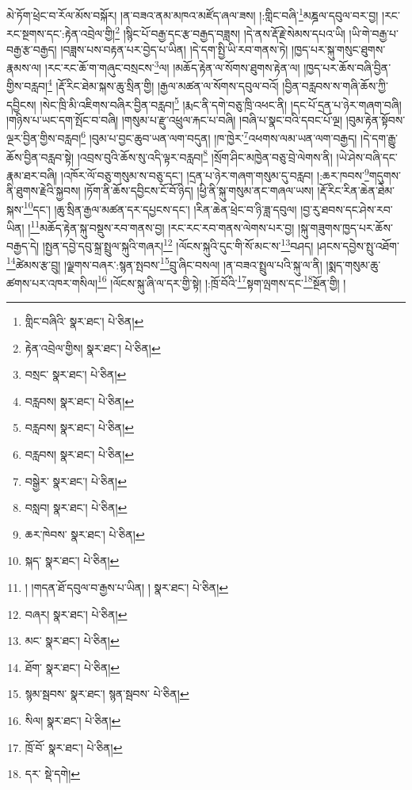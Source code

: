 མེ་ཏོག་ཕྲེང་བ་རོལ་མོས་བསྐོར། །ན་བཟའ་ནམ་མཁའ་མཛོད་ཞལ་ཟས། །:གླིང་བཞི་\footnote{གླིང་བཞིའི་  སྣར་ཐང་།  པེ་ཅིན། }མཎྜལ་དབུལ་བར་བྱ། །རང་རང་སྔགས་དང་:རྟེན་འབྲེལ་གྱི།\footnote{རྟེན་འབྲེལ་གྱིས།  སྣར་ཐང་།  པེ་ཅིན། } །སྙིང་པོ་བརྒྱ་དང་རྩ་བརྒྱད་བཟླས། །དེ་ནས་རྡོ་རྗེ་སེམས་དཔའ་ཡི། །ཡི་གེ་བརྒྱ་པ་བརྒྱ་རྩ་བརྒྱད། །བཟླས་པས་བརྟན་པར་བྱེད་པ་ཡིན། །དེ་དག་སྤྱི་ཡི་རབ་གནས་ཏེ། །ཁྱད་པར་སྐུ་གསུང་ཐུགས་རྣམས་ལ། །རང་རང་ཆོ་ག་གཞུང་བསྲངས་\footnote{བསྲང་  སྣར་ཐང་།  པེ་ཅིན། }ལ། །མཆོད་རྟེན་ལ་སོགས་ཐུགས་རྟེན་ལ། །ཁྱད་པར་ཆོས་བཞི་བྱིན་གྱིས་བརླབ།\footnote{བརླབས།  སྣར་ཐང་།  པེ་ཅིན། } །རྡོ་རིང་ཐེམ་སྐས་ཆུ་སྲིན་གྱི། །རྒྱལ་མཚན་ལ་སོགས་དབུལ་བའོ། །བྱིན་བརླབས་ས་གཞི་ཆོས་ཀྱི་དབྱིངས། །སེང་ཁྲི་མི་འཇིགས་བཞིར་བྱིན་བརླབ།\footnote{བརླབས།  སྣར་ཐང་།  པེ་ཅིན། } །རྨང་ནི་དགེ་བཅུ་ཁྲི་འཕང་ནི། །དང་པོ་དྲན་པ་ཉེར་གཞག་བཞི། །གཉིས་པ་ཡང་དག་སྤོང་བ་བཞི། །གསུམ་པ་རྫུ་འཕྲུལ་རྐང་པ་བཞི། །བཞི་པ་སྣང་བའི་དབང་པོ་ལྔ། །བུམ་རྟེན་སྟོབས་ལྔར་བྱིན་གྱིས་བརླབ།\footnote{བརླབས།  སྣར་ཐང་།  པེ་ཅིན། } །བུམ་པ་བྱང་ཆུབ་ཡན་ལག་བདུན། །ཁ་ཁྱེར་\footnote{བསྒྱེར་  སྣར་ཐང་།  པེ་ཅིན། }འཕགས་ལམ་ཡན་ལག་བརྒྱད། །དེ་དག་རྒྱུ་ཆོས་བྱིན་བརླབ་སྟེ། །འབྲས་བུའི་ཆོས་སུ་འདི་ལྟར་བརླབ།\footnote{བསླབ།  སྣར་ཐང་།  པེ་ཅིན། } །སྲོག་ཤིང་མཁྱེན་བཅུ་བྲེ་ལེགས་ནི། །ཡེ་ཤེས་བཞི་དང་རྣམ་ཐར་བཞི། །འཁོར་ལོ་བཅུ་གསུམ་ས་བཅུ་དང་། །དྲན་པ་ཉེར་གཞག་གསུམ་དུ་བརླབ། །:ཆར་ཁབས་\footnote{ཆར་ཁེབས་  སྣར་ཐང་།  པེ་ཅིན། }གདུགས་ནི་ཐུགས་རྗེའི་སྐྱབས། །ཏོག་ནི་ཆོས་དབྱིངས་ངོ་བོ་ཉིད། །ཕྱི་ནི་སྐུ་གསུམ་ནང་གཞལ་ཡས། །རྡོ་རིང་རིན་ཆེན་ཐེམ་སྐས་\footnote{སྐད་  སྣར་ཐང་།  པེ་ཅིན། }དང་། །ཆུ་སྲིན་རྒྱལ་མཚན་དར་དཔྱངས་དང་། །རིན་ཆེན་ཕྲེང་བ་ཉི་ཟླ་དབུལ། །བྱ་རུ་ཐབས་དང་ཤེས་རབ་ཡིན། །\footnote{། །གདན་ཐོ་དབུལ་བ་རྒྱས་པ་ཡིན། །  སྣར་ཐང་།  པེ་ཅིན། }མཆོད་རྟེན་སྐུ་བསྡུས་རབ་གནས་བྱ། །རང་རང་རབ་གནས་ལེགས་པར་བྱ། །སྐུ་གཟུགས་ཁྱད་པར་ཆོས་བརྒྱད་དེ། །སྤྱན་དབྱེ་དབུ་སྐྲ་སྤྲུལ་སྐུའི་གཞར།\footnote{བཞར།  སྣར་ཐང་།  པེ་ཅིན། } །ལོངས་སྐུའི་དུང་གི་སོ་མང་ས་\footnote{མང་  སྣར་ཐང་།  པེ་ཅིན། }བཤད། །ཤངས་དབྱེས་སྤུ་འཐོག་\footnote{ཐོག་  སྣར་ཐང་།  པེ་ཅིན། }ཚེམས་རྩ་བྲུ། །ལྗགས་བཞར་:སྙན་སྤབས་\footnote{སྙམ་སྦབས་  སྣར་ཐང་། སྙན་སྦབས་  པེ་ཅིན། }བྲུ་ཞིང་བསལ། །ན་བཟའ་སྤྲུལ་པའི་སྐུ་ལ་ནི། །སྨད་གསུམ་ཆུ་ཚགས་པར་འཁར་གསིལ།\footnote{སིལ།  སྣར་ཐང་།  པེ་ཅིན། } །ལོངས་སྐུ་ཞི་ལ་དར་གྱི་སྟེ། །:ཁྲོ་བོའི་\footnote{ཁྲོ་བོ་  སྣར་ཐང་།  པེ་ཅིན། }སྟག་ལྤགས་དང་\footnote{དར་  སྡེ་དགེ། }སྔོན་གྱི། །
